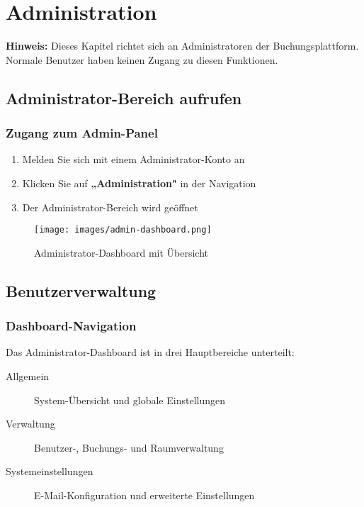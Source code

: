 \section{Administration}
\label{sec:administration}

\textbf{Hinweis:} Dieses Kapitel richtet sich an Administratoren der Buchungsplattform. Normale Benutzer haben keinen Zugang zu diesen Funktionen.

\subsection{Administrator-Bereich aufrufen}

\subsubsection{Zugang zum Admin-Panel}

\begin{enumerate}
    \item Melden Sie sich mit einem Administrator-Konto an
    \item Klicken Sie auf \textbf{„Administration"} in der Navigation
    \item Der Administrator-Bereich wird geöffnet
\end{enumerate}

\begin{figure}[H]
    \centering
    \texttt{[image: images/admin-dashboard.png]}
    \caption{Administrator-Dashboard mit Übersicht}
    \label{fig:admin-dashboard}
\end{figure}

\subsection{Benutzerverwaltung}

\subsubsection{Dashboard-Navigation}

Das Administrator-Dashboard ist in drei Hauptbereiche unterteilt:

\begin{description}
    \item[Allgemein] System-Übersicht und globale Einstellungen
    \item[Verwaltung] Benutzer-, Buchungs- und Raumverwaltung
    \item[Systemeinstellungen] E-Mail-Konfiguration und erweiterte Einstellungen
\end{description}

